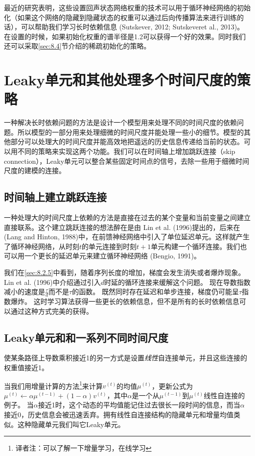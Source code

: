 最近的研究表明，这些设置回声状态网络权重的技术可以用于循环神经网络的初始化（如果这个网络的隐藏到隐藏状态的权重可以通过后向传播算法来进行训练的话），可以帮助我们学习长时依赖信息 (Sutskever, 2012; Sutskeveret al., 2013)。在设置的时候，如果初始化权重的谱半径是1.2可以获得一个好的效果。同时我们还可以采取\ref{sec:8.4}节介绍的稀疏初始化的策略。

\section{Leaky单元和其他处理多个时间尺度的策略}
\label{sec:10.9}
一种解决长时依赖问题的方法是设计一个模型用来处理不同的时间尺度的依赖问题。所以模型的一部分用来处理细微的时间尺度并能处理一些小的细节。模型的其他部分可以处理大的时间尺度并能高效地把遥远的历史信息传递给当前的状态。可以用不同的策略来实现这两个功能。我们可以在时间轴上增加跳跃连接（skip connection），Leaky单元可以整合某些固定时间点的信号，去除一些用于细微时间尺度的建模的连接。

\subsection{时间轴上建立跳跃连接}
\label{sec:10.9.1}
一种处理大的时间尺度上依赖的方法是直接在过去的某个变量和当前变量之间建立直接联系。这个建立跳跃连接的想法醉在是由 Lin et al. (1996)提出的，后来在 (Lang and Hinton, 1988)中，在前馈神经网络中引入了单位延迟单元。这样就产生了循环神经网络，从时刻$t$的单元连接到时刻$t+1$单元构建一个循环连接。我们也可以用一个更长的延迟单元来建立循环神经网络 (Bengio, 1991)。

我们在\ref{sec:8.2.5}中看到，随着序列长度的增加，梯度会发生消失或者爆炸现象。 Lin et al. (1996)中介绍通过引入$d$时延的循环连接来缓解这个问题。
现在导数指数减小的速度是$\frac{\tau}{d}$而不是$\tau$的函数。
既然同时存在延迟和单步连接，梯度仍可能呈$\tau$指数爆炸。
这时学习算法获得一些更长的依赖信息，但不是所有的长时依赖信息可以通过这种方式完美的获得。

\subsection{Leaky单元和和一系列不同时间尺度}
\label{sec:10.9.2}
使某条路径上导数乘积接近1的另一方式是设置\emph{线性}自连接单元，并且这些连接的权重值接近1。

当我们用增量计算的方法\footnote{译者注：可以了解一下增量学习，在线学习}来计算$v^{(t)}$的均值$\mu^{(t)}$，更新公式为$\mu^{(t)} \gets \alpha \mu^{(t-1)} + (1-\alpha) v^{(t)}$，其中$\alpha$是一个从$ \mu^{(t-1)}$到$ \mu^{(t)}$线性自连接的例子。 
当$\alpha$接近1时，这个动态的平均值能记住过去很长一段时间的信息，而当$\alpha$接近0，历史信息会被迅速丢弃。拥有线性自连接结构的隐藏单元和增量均值类似。这种隐藏单元我们叫它Leaky单元。

